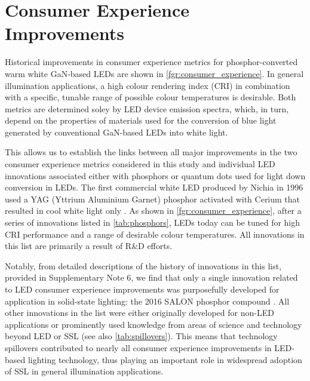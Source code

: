 \documentclass[parskip=full]{article}
\begin{document}
\section{Consumer Experience Improvements}

Historical improvements in consumer experience metrics for phosphor-converted warm white GaN-based LEDs are shown in \cref{fgr:consumer_experience}. In general illumination applications, a high colour rendering index (CRI) in combination with a specific, tunable range of possible colour temperatures is desirable. Both metrics are determined soley by LED device emission spectra, which, in turn, depend on the properties of materials used for the conversion of blue light generated by conventional GaN-based LEDs into white light.


This allows us to establish the links between all major improvements in the two consumer experience metrics considered in this study and individual LED innovations associated either with phosphors or quantum dots used for light down conversion in LEDs. The first commercial white LED produced by Nichia in 1996 used a YAG (Yttrium Aluminium Garnet) phosphor activated with Cerium that resulted in cool white light only \cite{bando1998development}. As shown in \cref{fgr:consumer_experience}, after a series of innovations listed in \cref{tab:phosphors}, LEDs today can be tuned for high CRI performance and a range of desirable colour temperatures. All innovations in this list are primarily a result of R\&D efforts.

Notably, from detailed descriptions of the history of innovations in this list, provided in Supplementary Note 6, we find that only a single innovation related to LED consumer experience improvements was purposefully developed for application in solid-state lighting: the 2016 SALON phosphor compound \cite{Hoerder2019,seibald2019phosphor}. All other innovations in the list were either originally developed for non-LED applications or prominently used knowledge from areas of science and technology beyond LED or SSL (see also \cref{tab:spillovers}). This means that technology spillovers contributed to nearly all consumer experience improvements in LED-based lighting technology, thus playing an important role in widespread adoption of SSL in general illumination applications. 
\end{document}
